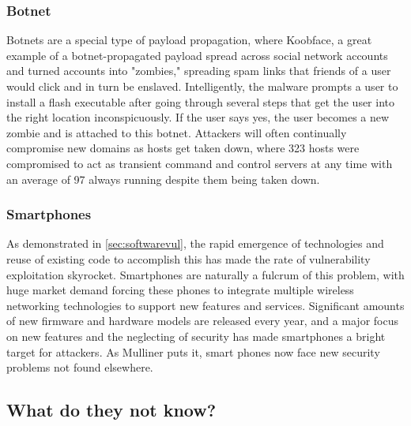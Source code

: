 \documentclass[a4paper, 11pt]{article}
\begin{document}
\subsubsection{Botnet}
\label{sec:botnet}
Botnets are a special type of payload propagation, where Koobface, a great example of a botnet-propagated payload spread across social network accounts and turned accounts into "zombies," spreading spam links that friends of a user would click and in turn be enslaved. \cite{ref:thomas2010koobface} Intelligently, the malware prompts a user to install a flash executable after going through several steps that get the user into the right location inconspicuously. If the user says yes, the user becomes a new zombie and is attached to this botnet. Attackers will often continually compromise new domains as hosts get taken down, where 323 hosts were compromised to act as transient command and control servers at any time with an average of 97 always running despite them being taken down.

\subsubsection{Smartphones}
\label{sec:smartphones}
As demonstrated in \ref{sec:softwarevul}, the rapid emergence of technologies and reuse of existing code to accomplish this has made the rate of vulnerability exploitation skyrocket. \cite{ref:jang2014survey} Smartphones are naturally a fulcrum of this problem, with huge market demand forcing these phones to integrate multiple wireless networking technologies to support new features and services. \cite{ref:mulliner2006security} Significant amounts of new firmware and hardware models are released every year, and a major focus on new features and the neglecting of security has made smartphones a bright target for attackers. \cite{ref:mulliner2006security} As Mulliner puts it, smart phones now face new security problems not found elsewhere.



\subsection{What do they not know?}
\end{document}

